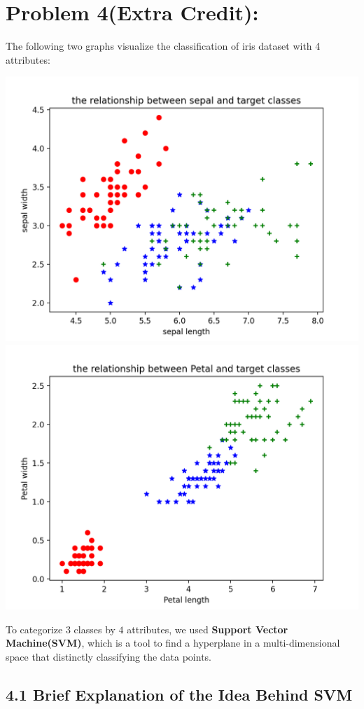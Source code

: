 \documentclass[12pt]{article}
\begin{document}
\section*{Problem 4(Extra Credit): }
The following two graphs visualize the classification of iris dataset with 4 attributes: 
\begin{center}
    \includegraphics[scale=0.35]{fig/ec1.png}
    \includegraphics[scale=0.35]{fig/ec2.png}  
\end{center}
To categorize 3 classes by $4$ attributes, we used \textbf{Support Vector Machine(SVM)}, which is a tool to find a hyperplane in a multi-dimensional space that distinctly classifying the data points. 

\subsection*{4.1 Brief Explanation of the Idea Behind SVM}
\end{document}
